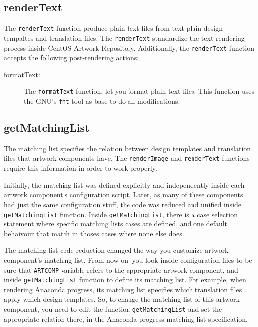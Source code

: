 \subsection{renderText}
\hypertarget{sec:Concepts:Scripts:Function:renderText}{}
\label{sec:Concepts:Scripts:Function:renderText}

The \texttt{renderText} function produce plain text files from text
plain design tempaltes and translation files. The \texttt{renderText}
standardize the text rendering process inside CentOS Artwork
Repository. Additionally, the \texttt{renderText} function accepts the
following post-rendering actions:

\begin{description}

\item[formatText:] The \texttt{formatText} function, let you format
plain text files. This function uses the GNU's \texttt{fmt} tool as
base to do all modifications.

\end{description}

\subsection{getMatchingList}
\hypertarget{sec:Concepts:Scripts:Function:getMatchingList}{}
\label{sec:Concepts:Scripts:Function:getMatchingList}

The matching list specifies the relation between design templates and
translation files that artwork components have. The
\texttt{renderImage} and \texttt{renderText} functions require this
information in order to work properly. 

Initially, the matching list was defined explicitly and independently
inside each artwork component's configuration script. Later, as many
of these components had just the same configuration stuff, the code
was reduced and unified inside \texttt{getMatchingList} function.
Inside \texttt{getMatchingList}, there is a case selection statement
where specific matching lists cases are defined, and one default
behaivour that match in thoses cases where none else does.  

The matching list code reduction changed the way you customize artwork
component's matching list.  From now on, you look inside configuration
files to be sure that \texttt{ARTCOMP} variable refers to the
appropriate artwork component, and inside \texttt{getMatchingList}
function to define its matching list.  For example, when rendering
Anaconda progress, its matching list specifies which translation files
apply which design templates. So, to change the matching list of this
artwork component, you need to edit the function
\texttt{getMatchingList} and set the appropriate relation there, in
the Anaconda progress matching list specification.

